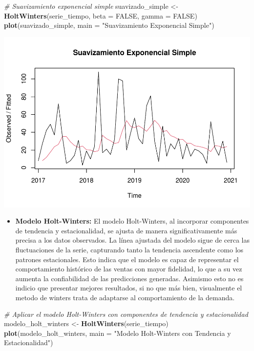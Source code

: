 \documentclass[
]{book}
\newenvironment{Shaded}{\begin{snugshade}}{\end{snugshade}}
\newcommand{\AttributeTok}[1]{\textcolor[rgb]{0.13,0.29,0.53}{#1}}
\newcommand{\CommentTok}[1]{\textcolor[rgb]{0.56,0.35,0.01}{\textit{#1}}}
\newcommand{\ConstantTok}[1]{\textcolor[rgb]{0.56,0.35,0.01}{#1}}
\newcommand{\FunctionTok}[1]{\textcolor[rgb]{0.13,0.29,0.53}{\textbf{#1}}}
\newcommand{\NormalTok}[1]{#1}
\newcommand{\OtherTok}[1]{\textcolor[rgb]{0.56,0.35,0.01}{#1}}
\newcommand{\StringTok}[1]{\textcolor[rgb]{0.31,0.60,0.02}{#1}}
\providecommand{\tightlist}{%
  \setlength{\itemsep}{0pt}\setlength{\parskip}{0pt}}
\begin{document}
\begin{Shaded}
\begin{Highlighting}[]
\CommentTok{\# Suavizamiento exponencial simple}
\NormalTok{suavizado\_simple }\OtherTok{\textless{}{-}} \FunctionTok{HoltWinters}\NormalTok{(serie\_tiempo, }\AttributeTok{beta =} \ConstantTok{FALSE}\NormalTok{, }\AttributeTok{gamma =} \ConstantTok{FALSE}\NormalTok{)}
\FunctionTok{plot}\NormalTok{(suavizado\_simple, }\AttributeTok{main =} \StringTok{"Suavizamiento Exponencial Simple"}\NormalTok{)}
\end{Highlighting}
\end{Shaded}

\includegraphics{_main_files/figure-latex/unnamed-chunk-25-1.pdf}

\begin{itemize}
\tightlist
\item
  \textbf{Modelo Holt-Winters:} El modelo Holt-Winters, al incorporar componentes de tendencia y estacionalidad, se ajusta de manera significativamente más precisa a los datos observados. La línea ajustada del modelo sigue de cerca las fluctuaciones de la serie, capturando tanto la tendencia ascendente como los patrones estacionales. Esto indica que el modelo es capaz de representar el comportamiento histórico de las ventas con mayor fidelidad, lo que a su vez aumenta la confiabilidad de las predicciones generadas. Asimismo esto no es indicio que presentar mejores resultados, si no que más bien, visualmente el metodo de winters trata de adaptarse al comportamiento de la demanda.
\end{itemize}

\begin{Shaded}
\begin{Highlighting}[]
\CommentTok{\# Aplicar el modelo Holt{-}Winters con componentes de tendencia y estacionalidad}
\NormalTok{modelo\_holt\_winters }\OtherTok{\textless{}{-}} \FunctionTok{HoltWinters}\NormalTok{(serie\_tiempo)}
\FunctionTok{plot}\NormalTok{(modelo\_holt\_winters, }\AttributeTok{main =} \StringTok{"Modelo Holt{-}Winters con Tendencia y Estacionalidad"}\NormalTok{)}
\end{Highlighting}
\end{Shaded}
\end{document}
